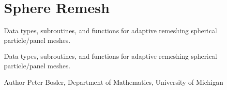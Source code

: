 \hypertarget{group__SphereRemesh}{\section{Sphere Remesh}
\label{group__SphereRemesh}
}


Data types, subroutines, and functions for adaptive remeshing spherical particle/panel meshes.  


Data types, subroutines, and functions for adaptive remeshing spherical particle/panel meshes. 

\begin{DoxyAuthor}{Author}
Peter Bosler, Department of Mathematics, University of Michigan 
\end{DoxyAuthor}
